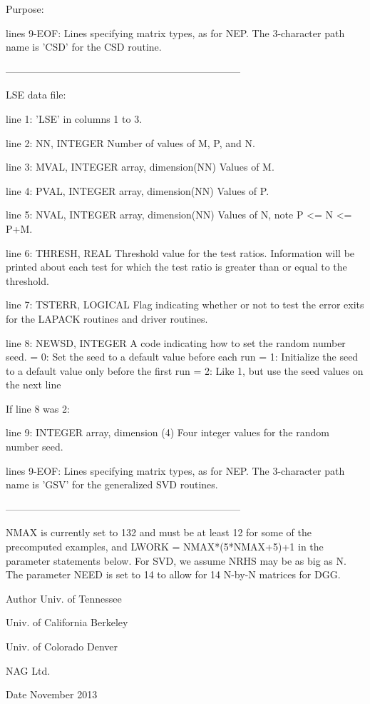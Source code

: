 \begin{DoxyParagraph}{Purpose\+: }
\begin{DoxyVerb}
 lines 9-EOF:  Lines specifying matrix types, as for NEP.
          The 3-character path name is 'CSD' for the CSD routine.

-----------------------------------------------------------------------

 LSE data file:

 line 1:  'LSE' in columns 1 to 3.

 line 2:  NN, INTEGER
          Number of values of M, P, and N.

 line 3:  MVAL, INTEGER array, dimension(NN)
          Values of M.

 line 4:  PVAL, INTEGER array, dimension(NN)
          Values of P.

 line 5:  NVAL, INTEGER array, dimension(NN)
          Values of N, note P <= N <= P+M.

 line 6:  THRESH, REAL
          Threshold value for the test ratios.  Information will be
          printed about each test for which the test ratio is greater
          than or equal to the threshold.

 line 7:  TSTERR, LOGICAL
          Flag indicating whether or not to test the error exits for
          the LAPACK routines and driver routines.

 line 8:  NEWSD, INTEGER
          A code indicating how to set the random number seed.
          = 0:  Set the seed to a default value before each run
          = 1:  Initialize the seed to a default value only before the
                first run
          = 2:  Like 1, but use the seed values on the next line

 If line 8 was 2:

 line 9:  INTEGER array, dimension (4)
          Four integer values for the random number seed.

 lines 9-EOF:  Lines specifying matrix types, as for NEP.
          The 3-character path name is 'GSV' for the generalized
          SVD routines.

-----------------------------------------------------------------------

 NMAX is currently set to 132 and must be at least 12 for some of the
 precomputed examples, and LWORK = NMAX*(5*NMAX+5)+1 in the parameter
 statements below.  For SVD, we assume NRHS may be as big as N.  The
 parameter NEED is set to 14 to allow for 14 N-by-N matrices for DGG.\end{DoxyVerb}
 
\end{DoxyParagraph}
\begin{DoxyAuthor}{Author}
Univ. of Tennessee 

Univ. of California Berkeley 

Univ. of Colorado Denver 

N\+A\+G Ltd. 
\end{DoxyAuthor}
\begin{DoxyDate}{Date}
November 2013 
\end{DoxyDate}
\hypertarget{group__double__eig_ga90e3a487742ba9acb39f783362b5b300}{}
